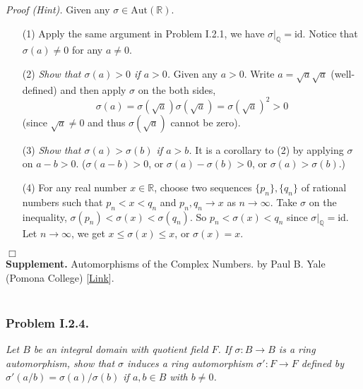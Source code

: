 \documentclass{article}
\begin{document}
\emph{Proof (Hint).}
Given any $\sigma \in \text{Aut}(\mathbb{R})$.
\begin{enumerate}
\item[(1)]
Apply the same argument in Problem I.2.1, we have $\sigma|_{\mathbb{Q}} = \text{id}$.
Notice that $\sigma(a) \neq 0$ for any $a \neq 0$.
\item[(2)]
\emph{Show that $\sigma(a) > 0$ if $a > 0$.}
Given any $a > 0$.
Write $a = \sqrt{a}\sqrt{a}$ (well-defined) and then apply
$\sigma$ on the both sides,
$$\sigma(a) = \sigma(\sqrt{a})\sigma(\sqrt{a}) = \sigma(\sqrt{a})^2 > 0$$
(since $\sqrt{a} \neq 0$ and thus $\sigma(\sqrt{a})$ cannot be zero).
\item[(3)]
\emph{Show that $\sigma(a) > \sigma(b)$ if $a > b$.}
It is a corollary to (2) by applying $\sigma$ on $a - b > 0$.
($\sigma(a - b) > 0$, or $\sigma(a) - \sigma(b) > 0$, or $\sigma(a) > \sigma(b)$.)
\item[(4)]
For any real number $x \in \mathbb{R}$,
choose two sequences $\{p_n\}, \{q_n\}$ of rational numbers
such that $p_n < x < q_n$ and $p_n, q_n \to x$ as $n \to \infty$.
Take $\sigma$ on the inequality, $\sigma(p_n) < \sigma(x) < \sigma(q_n)$.
So $p_n < \sigma(x) < q_n$ since $\sigma|_{\mathbb{Q}} = \text{id}$.
Let $n \to \infty$, we get $x \leq \sigma(x) \leq x$, or $\sigma(x) = x$.
\end{enumerate}
$\Box$ \\

\textbf{Supplement.}
Automorphisms of the Complex Numbers. by Paul B. Yale (Pomona College)
[\href{https://www.maa.org/sites/default/files/pdf/upload_library/22/Ford/PaulBYale.pdf}
{Link}]. \\\\






\subsubsection*{Problem I.2.4.}
\emph{Let $B$ be an integral domain with quotient field $F$.
If $\sigma: B \to B$ is a ring automorphism, show that $\sigma$ induces
a ring automorphism $\sigma': F \to F$ defined by
$\sigma'(a/b) = \sigma(a)/\sigma(b)$ if $a, b \in B$ with $b \neq 0$.} \\
\end{document}
